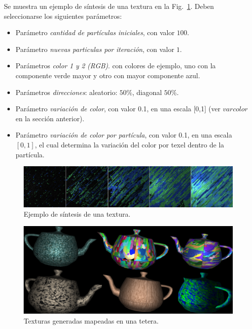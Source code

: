 Se muestra un ejemplo de s\'intesis de una textura en la Fig.~\ref{sintesis}. Deben seleccionarse los siguientes par\'ametros:

\begin{itemize}
\item Par\'ametro {\em cantidad de part\'iculas iniciales}, con valor $100$.
\item Par\'ametro {\em nuevas particulas por iteraci\'on}, con valor $1$.
\item Par\'ametros {\em color 1 y 2 (RGB)}. con colores de ejemplo, uno con la componente verde mayor y otro con mayor componente azul.
\item Par\'ametros {\em direcciones}: aleatorio: $50\%$, diagonal $50\%$.
\item Par\'ametro {\em variaci\'on de color}, con valor 0.1, en una escala [0,1] (ver $varcolor$ en la secci\'on anterior).
\item Par\'ametro {\em variaci\'on de color por part\'icula}, con valor 0.1, en una escala $[0,1]$, el cual determina la variaci\'on del color por texel dentro de la part\'icula.
\end{itemize}

\begin{figure}[t!]
\centering
\includegraphics[scale=0.12]{figures/sintesis}
\caption{Ejemplo de s\'intesis de una textura.}
\label{sintesis}
\end{figure}

\begin{figure}[t!]
\centering
\includegraphics[scale=0.14]{figures/teteras}
\caption{Texturas generadas mapeadas en una tetera.}
\label{teteras}
\end{figure}


